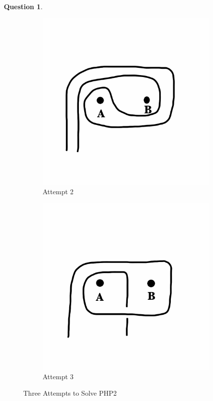 \documentclass[12pt,letterpaper]{article}
\theoremstyle{definition}
\newtheorem{question}{Question}
\begin{document}
\begin{question}
\begin{figure}[h!]
\begin{subfigure}[b]{0.3\textwidth}
        \includegraphics[width=\textwidth]{rgp01pics/attempt2.png}
        \caption{Attempt 2}
    \end{subfigure}
    \begin{subfigure}[b]{0.3\textwidth}
        \includegraphics[width=\textwidth]{rgp01pics/attempt3.png}
        \caption{Attempt 3}
    \end{subfigure}
    \caption{Three Attempts to Solve PHP2}
\end{figure}
\end{question}
\end{document}
